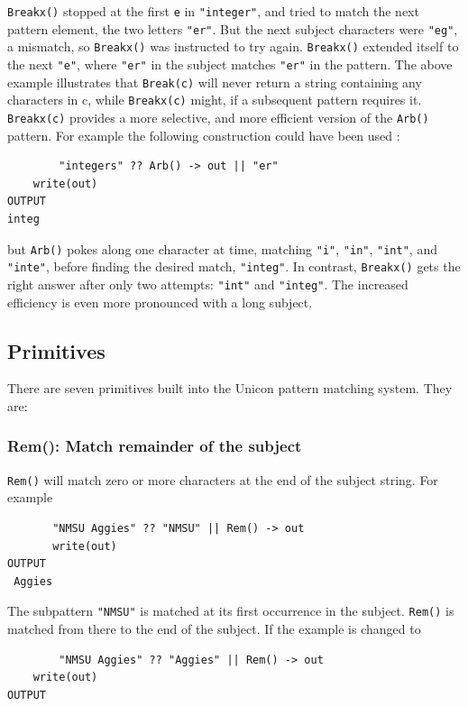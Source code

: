\documentclass[letterpaper,12pt]{article}
\begin{document}
{\tt Breakx()} stopped at the first {\tt e} in {\tt "integer"},
and tried to match
the next pattern element, the two letters {\tt "er"}. But the next subject
characters were {\tt "eg"}, a mismatch, so {\tt Breakx()} was instructed to try
again. {\tt Breakx()} extended itself to the next {\tt "e"}, where
{\tt "er"} in the
subject matches {\tt "er"} in the pattern.  The above example illustrates
that {\tt Break(c)} will never return a string containing any characters in
c, while {\tt Breakx(c)} might, if a subsequent pattern requires it.
{\tt Breakx(c)} provides a more selective, and more efficient version of
the {\tt Arb()} pattern. For example the following construction could have
been used :

\begin{verbatim}
        "integers" ?? Arb() -> out || "er"
	write(out)
OUTPUT
integ
\end{verbatim}

but {\tt Arb()} pokes along one character at time, matching
{\tt "i"}, {\tt "in"},
{\tt "int"}, and {\tt "inte"}, before finding the desired match,
{\tt "integ"}. In
contrast, {\tt Breakx()} gets the right answer after only two attempts:
{\tt "int"} and {\tt "integ"}. The increased efficiency is even more pronounced
with a long subject.

\subsection{Primitives}

There are seven primitives built into the Unicon pattern matching
system. They are:

\subsubsection{Rem(): Match remainder of the subject}

{\tt Rem()} will match zero or more characters at the end of the subject
string. For example

\begin{verbatim}
       "NMSU Aggies" ?? "NMSU" || Rem() -> out
       write(out)
OUTPUT
 Aggies
\end{verbatim}

The subpattern {\tt "NMSU"} is matched at its first occurrence in the
subject. {\tt Rem()} is matched from there to the end of the subject.
If the example is changed to

\begin{verbatim}
        "NMSU Aggies" ?? "Aggies" || Rem() -> out
	write(out)
OUTPUT

\end{verbatim}
\end{document}
